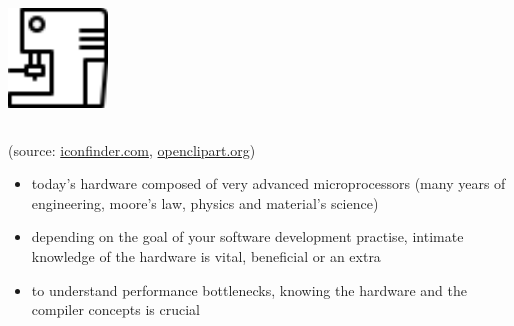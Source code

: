 \documentclass[9pt,xcolor=table]{beamer}
\begin{document}
\begin{frame}
\begin{columns}[c]
\begin{column}{.35\textwidth}
    \begin{center}
      \includegraphics[height=0.3\textheight]{img/iconfinder_coffee_machine}
    \end{center}
  \end{column}
\end{columns}
\begin{center}
  \small (source: \href{www.iconfinder.com}{iconfinder.com},
  \href{openclipart.org}{openclipart.org})
\end{center}
\begin{itemize}\large
\item<1-> today's hardware composed of very advanced microprocessors (many years of engineering, moore's law, physics and material's science)
\item<2-> depending on the goal of your software development practise, intimate knowledge of the hardware is vital, beneficial or an extra
\item<3-> to understand performance bottlenecks, knowing the hardware and the compiler concepts is crucial 
\end{itemize}

\end{frame}
\end{document}
